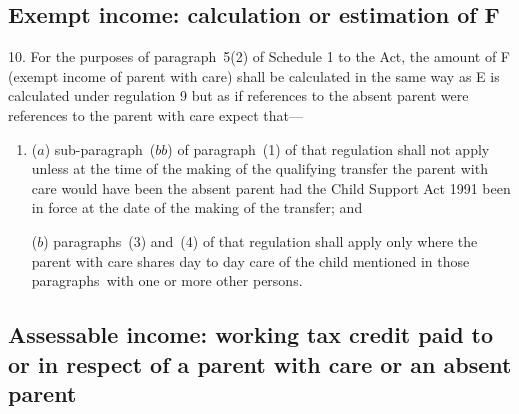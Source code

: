 \documentclass[12pt,a4paper]{article}
\begin{document}
\subsection[10. Exempt income: calculation or estimation of F]{Exempt income: calculation or estimation of F}

10.  For the purposes of paragraph~5(2) of Schedule 1 to the Act, the amount of F (exempt income of parent with care) shall be calculated in the same way as E is calculated under regulation 9 but as if references to the absent parent were references to the parent with care
expect that—
\begin{enumerate}\item[]
($a$) sub-paragraph~($bb$) of paragraph~(1) of that regulation shall not apply unless at the time of the making of the qualifying transfer the parent with care would have been the absent parent had the Child Support Act 1991 been in force at the date of the making of the transfer; and

($b$) paragraphs~(3) and~(4) of that regulation shall apply only where the parent with care shares day to day care of the child mentioned in those paragraphs~with one or more other persons.
\end{enumerate}  %


\subsection[10A. Assessable income: 
working tax credit  %
paid to or in respect of a parent with care or an absent parent]{\sloppy Assessable income: 
working tax credit  %
paid to or in respect of a parent with care or an absent parent}
\end{document}
